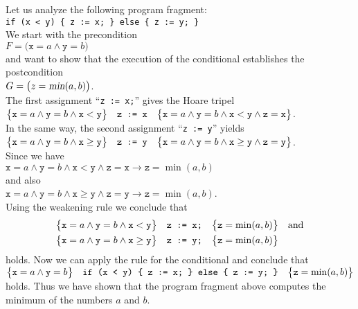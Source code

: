 \example
Let us analyze the following program fragment:
\\[0.2cm]
\hspace*{1.3cm}
\texttt{if (x < y) \{ z := x; \} else \{ z := y; \}}
\\[0.2cm]
We start with the precondition
\\[0.2cm]
\hspace*{1.3cm}
$F = \bigl(\texttt{x} = a \wedge \texttt{y} = b\bigr)$
\\[0.2cm]
and want to show that the execution of the conditional establishes the postcondition
\\[0.2cm]
\hspace*{1.3cm}
$G = \bigl(z = \textsl{min}(a, b)\bigr)$.
\\[0.2cm]
The first assignment ``\texttt{z := x;}'' gives the Hoare tripel 
\\[0.2cm]
\hspace*{1.3cm}
$\bigl\{\texttt{x} = a \wedge \texttt{y} = b \wedge \texttt{x} < \texttt{y}\bigr\}\quad\texttt{z := x}\quad\bigl\{
          \texttt{x} = a \wedge \texttt{y} = b \wedge \texttt{x} < \texttt{y} \wedge \texttt{z} = \texttt{x}\bigr\}
$.
\\[0.2cm]
In the same way, the second assignment ``\texttt{z := y}'' yields
\\[0.2cm]
\hspace*{1.3cm}
$\bigl\{\texttt{x} = a \wedge \texttt{y} = b \wedge \texttt{x} \geq \texttt{y}\bigr\}\quad\texttt{z := y}\quad\bigl\{
          \texttt{x} = a \wedge \texttt{y} = b \wedge \texttt{x} \geq \texttt{y} \wedge
          \texttt{z} = \texttt{y}\bigr\}$.
\\[0.2cm]
Since we have
\\[0.2cm]
\hspace*{1.3cm}
$\texttt{x} = a \wedge \texttt{y} = b \wedge \texttt{x} < \texttt{y} \wedge \texttt{z} = \texttt{x}
   \rightarrow \texttt{z} = \min(a,b)$
\\[0.2cm]
and also
\\[0.2cm]
\hspace*{1.3cm}
$ \texttt{x} = a \wedge \texttt{y} = b \wedge \texttt{x} \geq \texttt{y} \wedge \texttt{z} = \texttt{y} 
   \rightarrow \texttt{z} = \min(a,b)
$.
\\[0.2cm]
Using the weakening rule we conclude that 
\begin{eqnarray*}
\bigl\{\texttt{x} = a \wedge \texttt{y} = b \wedge \texttt{x} < \texttt{y}\bigr\}\quad\texttt{z := x;}\quad\bigl\{
       \texttt{z} = \min(a,b)\bigr\} & & \mathrm{and} \\
\bigl\{\texttt{x} = a \wedge \texttt{y} = b \wedge \texttt{x} \geq \texttt{y}\bigr\}\quad\texttt{z := y;}\quad\bigl\{
          \texttt{z} = \min(a,b)\bigr\}
\end{eqnarray*}
holds.  Now we can apply the rule for the conditional and conclude
that 
\\[0.2cm]
$ \bigl\{\texttt{x} = a \wedge \texttt{y} = b\bigr\}\quad\texttt{if (x < y) \{ z := x; \} else \{ z := y; \}}\quad\bigl\{ \texttt{z} = \min(a,b)\bigr\} $
\\[0.2cm]
holds.  Thus we have shown that the program fragment above computes
the minimum of the numbers $a$ and $b$.

